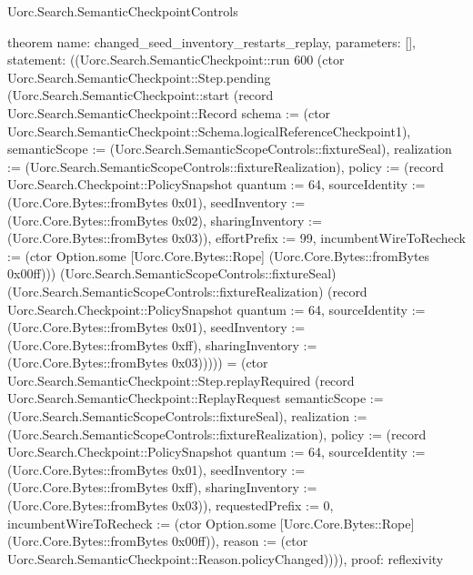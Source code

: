 \begin{lexlean}{Uorc.Search.SemanticCheckpointControls}
\begin{semanticmodule}
theorem{
  name: changed_seed_inventory_restarts_replay,
  parameters: [],
  statement: ((Uorc.Search.SemanticCheckpoint::run 600 (ctor Uorc.Search.SemanticCheckpoint::Step.pending (Uorc.Search.SemanticCheckpoint::start (record Uorc.Search.SemanticCheckpoint::Record {schema := (ctor Uorc.Search.SemanticCheckpoint::Schema.logicalReferenceCheckpoint1), semanticScope := (Uorc.Search.SemanticScopeControls::fixtureSeal), realization := (Uorc.Search.SemanticScopeControls::fixtureRealization), policy := (record Uorc.Search.Checkpoint::PolicySnapshot {quantum := 64, sourceIdentity := (Uorc.Core.Bytes::fromBytes 0x01), seedInventory := (Uorc.Core.Bytes::fromBytes 0x02), sharingInventory := (Uorc.Core.Bytes::fromBytes 0x03)}), effortPrefix := 99, incumbentWireToRecheck := (ctor Option.some [Uorc.Core.Bytes::Rope] (Uorc.Core.Bytes::fromBytes 0x00ff))}) (Uorc.Search.SemanticScopeControls::fixtureSeal) (Uorc.Search.SemanticScopeControls::fixtureRealization) (record Uorc.Search.Checkpoint::PolicySnapshot {quantum := 64, sourceIdentity := (Uorc.Core.Bytes::fromBytes 0x01), seedInventory := (Uorc.Core.Bytes::fromBytes 0xff), sharingInventory := (Uorc.Core.Bytes::fromBytes 0x03)})))) = (ctor Uorc.Search.SemanticCheckpoint::Step.replayRequired (record Uorc.Search.SemanticCheckpoint::ReplayRequest {semanticScope := (Uorc.Search.SemanticScopeControls::fixtureSeal), realization := (Uorc.Search.SemanticScopeControls::fixtureRealization), policy := (record Uorc.Search.Checkpoint::PolicySnapshot {quantum := 64, sourceIdentity := (Uorc.Core.Bytes::fromBytes 0x01), seedInventory := (Uorc.Core.Bytes::fromBytes 0xff), sharingInventory := (Uorc.Core.Bytes::fromBytes 0x03)}), requestedPrefix := 0, incumbentWireToRecheck := (ctor Option.some [Uorc.Core.Bytes::Rope] (Uorc.Core.Bytes::fromBytes 0x00ff)), reason := (ctor Uorc.Search.SemanticCheckpoint::Reason.policyChanged)}))),
  proof: reflexivity{}
}


\end{semanticmodule}
\end{lexlean}
